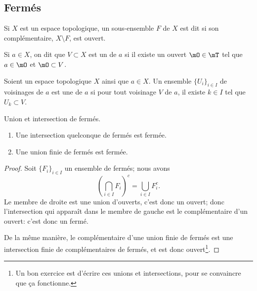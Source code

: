 \subsection{Fermés}

\begin{definition}	\label{DEFFermeooNSAAooHxZbAo}
	Si \(X \) est un espace topologique, un sous-ensemble \( F \) de \( X \) est dit  si son complémentaire, \( X\setminus F \), est ouvert.
\end{definition}

\begin{definition}		\label{DEFVoisinageooGHZCooLRcpXY}
	Si \(a \in X\), on dit que \(V \subset X\) est un  de \(a\) si il existe un ouvert \(\mO \in \mT\) tel que \(a \in \mO\) et \(\mO \subset V\).
\end{definition}

\begin{definition}       \label{DEFooBWZIooXotZLA}
	Soient un espace topologique \( X\) ainsi que \( a\in X\). Un ensemble \( \{ U_i \}_{i\in I}\) de voisinages de \( a\) est une  de \( a\) si pour tout voisinage \( V\) de \( a\), il existe \( k\in I\) tel que \( U_k\subset V\).
\end{definition}

\begin{lemma}   \label{LemQYUJwPC}
	Union et intersection de fermés.
	\begin{enumerate}
		\item       \label{ITEMooBHIGooMvkUtX}
		      Une intersection quelconque de fermés est fermée.
		\item       \label{ItemKJYVooMBmMbG}
		      Une union finie de fermés est fermée.
	\end{enumerate}
\end{lemma}

\begin{proof}
	Soit \( \{ F_i \}_{i\in I} \) un ensemble de fermés; nous avons
	\begin{equation}
		\left( \bigcap_{i\in I}F_i \right)^c=\bigcup_{i\in I}F_i^c.
	\end{equation}
	Le membre de droite est une union d'ouverts, c'est donc un ouvert; donc l'intersection qui apparaît dans le membre de gauche est le complémentaire d'un ouvert: c'est donc un fermé.

	De la même manière, le complémentaire d'une union finie de fermés est une intersection finie de complémentaires de fermés, et est donc ouvert\footnote{Un bon exercice est d'écrire ces unions et intersections, pour se convaincre que ça fonctionne.}.
\end{proof}

